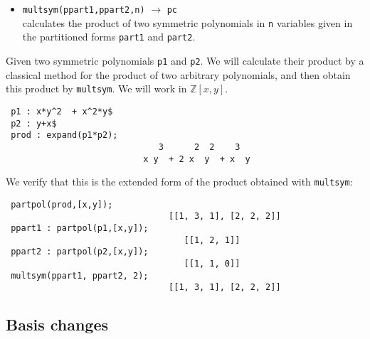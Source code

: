 \documentclass[11pt]{article}
\begin{document}
\begin{itemize}
\item\texttt{multsym(ppart1,ppart2,n)}
  $\longrightarrow$ \texttt{pc} \\
  calculates the product of two symmetric polynomials in \texttt{n} variables
  given in the partitioned forms \texttt{part1} and \texttt{part2}.
\end{itemize}
Given two symmetric polynomials \texttt{p1} and \texttt{p2}. We will
calculate their product by a classical method for the product of two
arbitrary polynomials, and then obtain this product by \texttt{multsym}. We will
work in $\mathbb{Z}[x,y]$.
\small
\begin{verbatim}
 p1 : x*y^2  + x^2*y$
 p2 : y+x$
 prod : expand(p1*p2);
                              3      2  2    3
                           x y  + 2 x  y  + x  y
\end{verbatim}
\normalsize
We verify that this is the extended form of the product obtained with
\texttt{multsym}:
\small
\begin{verbatim}
 partpol(prod,[x,y]);
                                [[1, 3, 1], [2, 2, 2]]
 ppart1 : partpol(p1,[x,y]);
                                   [[1, 2, 1]]
 ppart2 : partpol(p2,[x,y]);
                                   [[1, 1, 0]]
 multsym(ppart1, ppart2, 2);
                                [[1, 3, 1], [2, 2, 2]]
\end{verbatim}
\normalsize


\subsection{Basis changes}
\end{document}
